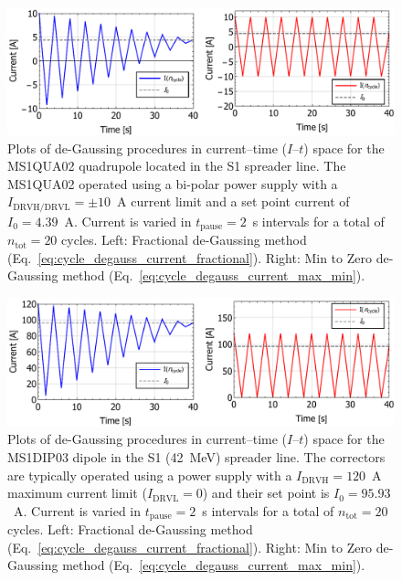 \documentclass[../main.tex]{subfiles}
\begin{document}
\begin{figure}[!h]
\centering
\includegraphics[width=\textwidth]{Figures/CBETA_Multi-Pass_Commissioning/degauss_current_time_MS1QUA02.pdf}
\caption{Plots of de-Gaussing procedures in current--time ($I$--$t$) space for the MS1QUA02 quadrupole located in the S1 spreader line. The MS1QUA02 operated using a bi-polar power supply with a $I_{\mathrm{DRVH/DRVL}}=\pm10$~\si{\ampere} current limit and a set point current of $I_{0}=4.39$~\si{\ampere}. Current is varied in $t_{\mathrm{pause}}=2$~\si{\second} intervals for a total of $n_{\mathrm{tot}}=20$ cycles. Left: Fractional de-Gaussing method (Eq.~\ref{eq:cycle_degauss_current_fractional}). Right: Min to Zero de-Gaussing method (Eq.~\ref{eq:cycle_degauss_current_max_min}).}
\label{fig:MS1QUA02_degauss_procedure}
\end{figure}

\begin{figure}[!h]
\centering
\includegraphics[width=\textwidth]{Figures/CBETA_Multi-Pass_Commissioning/degauss_current_time_MS1DIP03.pdf}
\caption{Plots of de-Gaussing procedures in current--time ($I$--$t$) space for the MS1DIP03 dipole in the S1 (42~\si{\mega\electronvolt}) spreader line. The correctors are typically operated using a power supply with a $I_{\mathrm{DRVH}}=120$~\si{\ampere} maximum current limit ($I_{\mathrm{DRVL}}=0$) and their set point is $I_{0}=95.93$~\si{\ampere}. Current is varied in $t_{\mathrm{pause}}=2$~\si{\second} intervals for a total of $n_{\mathrm{tot}}=20$ cycles. Left: Fractional de-Gaussing method (Eq.~\ref{eq:cycle_degauss_current_fractional}). Right: Min to Zero de-Gaussing method (Eq.~\ref{eq:cycle_degauss_current_max_min}).}
\label{fig:MS1DIP03_degauss_procedure}
\end{figure}
\end{document}

